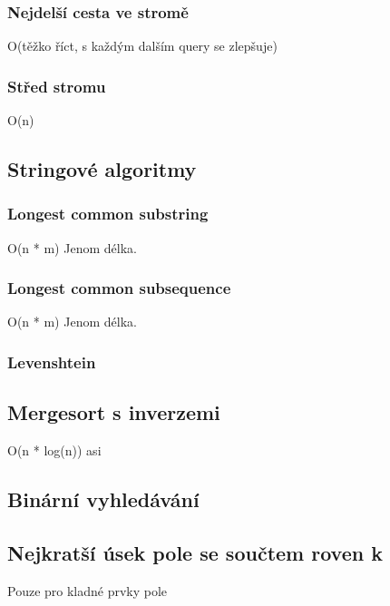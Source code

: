 \documentclass[10pt, a4paper, twoside]{article}
\begin{document}
\subsubsection{Nejdelší cesta ve stromě}
O(těžko říct, s každým dalším query se zlepšuje)


\subsubsection{Střed stromu}
O(n)



\subsection{Stringové algoritmy}
\subsubsection{Longest common substring}
O(n * m)
Jenom délka.


\subsubsection{Longest common subsequence}
O(n * m)
Jenom délka.


\subsubsection{Levenshtein}


\subsection{Mergesort s inverzemi}
O(n * log(n)) asi


\subsection{Binární vyhledávání}


\subsection{Nejkratší úsek pole se součtem roven k}
Pouze pro kladné prvky pole

\end{document}
